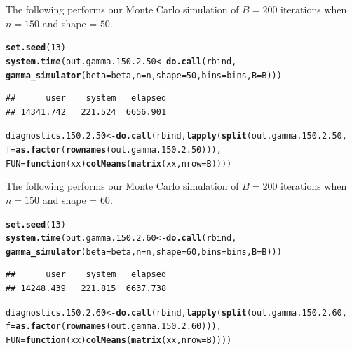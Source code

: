 \documentclass[11pt]{article}\usepackage[]{graphicx}\usepackage[]{color}
\makeatletter
\newcommand{\hlnum}[1]{\textcolor[rgb]{0.686,0.059,0.569}{#1}}%
\newcommand{\hlstd}[1]{\textcolor[rgb]{0.345,0.345,0.345}{#1}}%
\newcommand{\hlkwa}[1]{\textcolor[rgb]{0.161,0.373,0.58}{\textbf{#1}}}%
\newcommand{\hlkwb}[1]{\textcolor[rgb]{0.69,0.353,0.396}{#1}}%
\newcommand{\hlkwc}[1]{\textcolor[rgb]{0.333,0.667,0.333}{#1}}%
\newcommand{\hlkwd}[1]{\textcolor[rgb]{0.737,0.353,0.396}{\textbf{#1}}}%
\newenvironment{kframe}{%
 \def\at@end@of@kframe{}%
 \ifinner\ifhmode%
  \def\at@end@of@kframe{\end{minipage}}%
  \begin{minipage}{\columnwidth}%
 \fi\fi%
 \def\FrameCommand##1{\hskip\@totalleftmargin \hskip-\fboxsep
 \colorbox{shadecolor}{##1}\hskip-\fboxsep
     \hskip-\linewidth \hskip-\@totalleftmargin \hskip\columnwidth}%
 \MakeFramed {\advance\hsize-\width
   \@totalleftmargin\z@ \linewidth\hsize
   \@setminipage}}%
 {\par\unskip\endMakeFramed%
 \at@end@of@kframe}
\newenvironment{knitrout}{}{} %
\makeatother
\begin{document}
The following performs our Monte Carlo simulation of $B = 200$ iterations 
when $n = 150$ and shape = $50$.

\begin{knitrout}
\color{fgcolor}\begin{kframe}
\begin{alltt}
\hlkwd{set.seed}\hlstd{(}\hlnum{13}\hlstd{)}
\hlkwd{system.time}\hlstd{(out.gamma.150.2.50} \hlkwb{<-} \hlkwd{do.call}\hlstd{(rbind,}
  \hlkwd{gamma_simulator}\hlstd{(}\hlkwc{beta} \hlstd{= beta,} \hlkwc{n} \hlstd{= n,} \hlkwc{shape} \hlstd{=} \hlnum{50}\hlstd{,} \hlkwc{bins} \hlstd{= bins,} \hlkwc{B} \hlstd{= B)))}
\end{alltt}
\begin{verbatim}
##      user    system   elapsed 
## 14341.742   221.524  6656.901
\end{verbatim}
\begin{alltt}
\hlstd{diagnostics.150.2.50} \hlkwb{<-} \hlkwd{do.call}\hlstd{(rbind,} \hlkwd{lapply}\hlstd{(}\hlkwd{split}\hlstd{(out.gamma.150.2.50,}
  \hlkwc{f} \hlstd{=} \hlkwd{as.factor}\hlstd{(}\hlkwd{rownames}\hlstd{(out.gamma.150.2.50))),}
  \hlkwc{FUN} \hlstd{=} \hlkwa{function}\hlstd{(}\hlkwc{xx}\hlstd{)} \hlkwd{colMeans}\hlstd{(}\hlkwd{matrix}\hlstd{(xx,} \hlkwc{nrow} \hlstd{= B))))}
\end{alltt}
\end{kframe}
\end{knitrout}




The following performs our Monte Carlo simulation of $B = 200$ iterations 
when $n = 150$ and shape = $60$.

\begin{knitrout}
\color{fgcolor}\begin{kframe}
\begin{alltt}
\hlkwd{set.seed}\hlstd{(}\hlnum{13}\hlstd{)}
\hlkwd{system.time}\hlstd{(out.gamma.150.2.60} \hlkwb{<-} \hlkwd{do.call}\hlstd{(rbind,}
  \hlkwd{gamma_simulator}\hlstd{(}\hlkwc{beta} \hlstd{= beta,} \hlkwc{n} \hlstd{= n,} \hlkwc{shape} \hlstd{=} \hlnum{60}\hlstd{,} \hlkwc{bins} \hlstd{= bins,} \hlkwc{B} \hlstd{= B)))}
\end{alltt}
\begin{verbatim}
##      user    system   elapsed 
## 14248.439   221.815  6637.738
\end{verbatim}
\begin{alltt}
\hlstd{diagnostics.150.2.60} \hlkwb{<-} \hlkwd{do.call}\hlstd{(rbind,} \hlkwd{lapply}\hlstd{(}\hlkwd{split}\hlstd{(out.gamma.150.2.60,}
  \hlkwc{f} \hlstd{=} \hlkwd{as.factor}\hlstd{(}\hlkwd{rownames}\hlstd{(out.gamma.150.2.60))),}
  \hlkwc{FUN} \hlstd{=} \hlkwa{function}\hlstd{(}\hlkwc{xx}\hlstd{)} \hlkwd{colMeans}\hlstd{(}\hlkwd{matrix}\hlstd{(xx,} \hlkwc{nrow} \hlstd{= B))))}
\end{alltt}
\end{kframe}
\end{knitrout}
\end{document}
